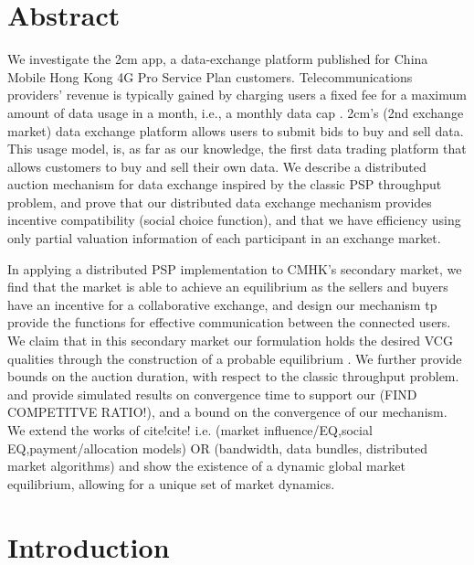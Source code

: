 \documentclass[12pt]{article}
\theoremstyle{definition}
\begin{document}
\begin{multicols}{2}

\section{Abstract}

We investigate the 2cm app, a data-exchange platform published for China Mobile Hong
Kong 4G Pro Service Plan customers. Telecommunications providers' revenue is typically
gained by charging users a fixed fee for a maximum amount
of data usage in a month, i.e., a monthly data cap \cite{???}. 
2cm's (2nd exchange market) data exchange platform allows users to submit
bids to buy and sell data.
This usage model, is, as far as our knowledge, the first data trading
platform that allows customers to buy and sell their own data.
We describe a distributed auction mechanism for data exchange inspired by the
classic PSP throughput problem,
and prove that our distributed data exchange mechanism provides incentive
compatibility (social choice function), and that we have efficiency
using only partial valuation information of each participant in an exchange market.

In applying a distributed PSP implementation to CMHK's secondary market, we
find that
the market is able to achieve an equilibrium as the sellers and buyers have an
incentive for a collaborative exchange, and design our mechanism tp provide the functions
for effective communication between the connected users. We claim that in
this secondary market our formulation holds the desired VCG qualities through the construction of a
probable equilibrium \cite{???}. We further provide bounds on the auction duration, 
with respect to the classic throughput problem.
and provide simulated results on convergence time to support our (FIND
COMPETITVE RATIO!), and a bound
on the convergence of our mechanism. We extend the works of cite!cite!
i.e. (market influence/EQ,social EQ,payment/allocation models) OR (bandwidth, data bundles, distributed
market algorithms) and show the existence of a dynamic global market equilibrium, allowing for a unique set of market dynamics.



\section{Introduction}


\end{multicols}
\end{document}
